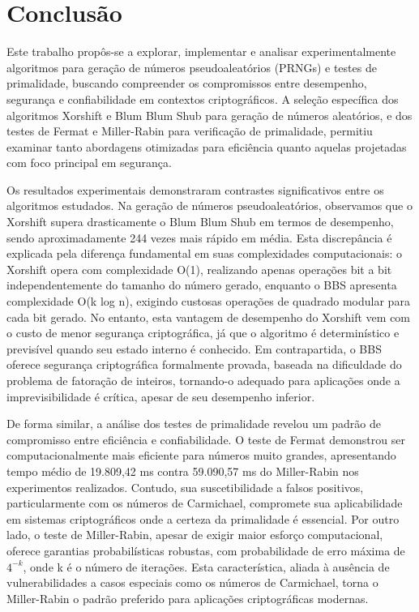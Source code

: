 \chapter{Conclusão}

Este trabalho propôs-se a explorar, implementar e analisar experimentalmente algoritmos para geração de números pseudoaleatórios (PRNGs) e testes de primalidade, buscando compreender os compromissos entre desempenho, segurança e confiabilidade em contextos criptográficos. A seleção específica dos algoritmos Xorshift e Blum Blum Shub para geração de números aleatórios, e dos testes de Fermat e Miller-Rabin para verificação de primalidade, permitiu examinar tanto abordagens otimizadas para eficiência quanto aquelas projetadas com foco principal em segurança.

Os resultados experimentais demonstraram contrastes significativos entre os algoritmos estudados. Na geração de números pseudoaleatórios, observamos que o Xorshift supera drasticamente o Blum Blum Shub em termos de desempenho, sendo aproximadamente 244 vezes mais rápido em média. Esta discrepância é explicada pela diferença fundamental em suas complexidades computacionais: o Xorshift opera com complexidade O(1), realizando apenas operações bit a bit independentemente do tamanho do número gerado, enquanto o BBS apresenta complexidade O(k log n), exigindo custosas operações de quadrado modular para cada bit gerado. No entanto, esta vantagem de desempenho do Xorshift vem com o custo de menor segurança criptográfica, já que o algoritmo é determinístico e previsível quando seu estado interno é conhecido. Em contrapartida, o BBS oferece segurança criptográfica formalmente provada, baseada na dificuldade do problema de fatoração de inteiros, tornando-o adequado para aplicações onde a imprevisibilidade é crítica, apesar de seu desempenho inferior.

De forma similar, a análise dos testes de primalidade revelou um padrão de compromisso entre eficiência e confiabilidade. O teste de Fermat demonstrou ser computacionalmente mais eficiente para números muito grandes, apresentando tempo médio de 19.809,42 ms contra 59.090,57 ms do Miller-Rabin nos experimentos realizados. Contudo, sua suscetibilidade a falsos positivos, particularmente com os números de Carmichael, compromete sua aplicabilidade em sistemas criptográficos onde a certeza da primalidade é essencial. Por outro lado, o teste de Miller-Rabin, apesar de exigir maior esforço computacional, oferece garantias probabilísticas robustas, com probabilidade de erro máxima de $4^{-k}$, onde k é o número de iterações. Esta característica, aliada à ausência de vulnerabilidades a casos especiais como os números de Carmichael, torna o Miller-Rabin o padrão preferido para aplicações criptográficas modernas.

